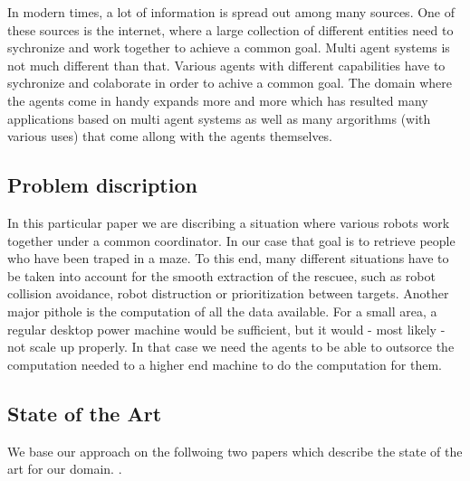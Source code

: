 In modern times, a lot of information is spread out among many sources.
One of these sources is the internet, where a large collection of different entities need to sychronize and work together to achieve a common goal. Multi agent systems is not much different than that. Various agents with different capabilities have to sychronize and colaborate in order to achive a common goal. The domain where the agents come in handy expands more and more which has resulted many applications based on multi agent systems as well as many argorithms (with various uses) that come allong with the agents themselves. 

\subsection{Problem discription}
In this particular paper we are discribing a situation where various robots work together under a common coordinator. In our case that goal is to retrieve people who have been traped in a maze. To this end, many different situations have to be taken into account for the smooth extraction of the rescuee, such as robot collision avoidance, robot distruction or prioritization between targets. Another major pithole is the computation of all the data available. For a small area, a regular desktop power machine would be sufficient, but it would - most likely - not scale up properly. In that case we need the agents to be able to outsorce the computation needed to a higher end machine to do the computation for them.


\subsection{State of the Art}
We base our approach on the follwoing two papers which describe the state of the art for our domain. 
\cite{intframe}.

